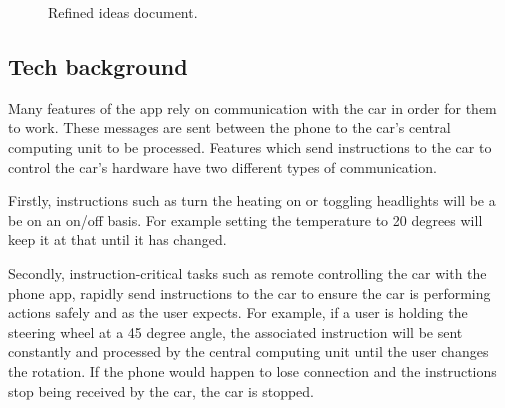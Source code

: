 \documentclass{article}
\begin{document}
\begin{figure}[H]
  \centering
  \caption{Refined ideas document.}\label{refined-ideas}
\end{figure}

\subsection{Tech background}\label{ssec:app-tech} %
Many features of the app rely on communication with the car in order for them to work. These messages are sent between the phone to the car's central computing unit to be processed. Features which send instructions to the car to control the car's hardware have two different types of communication.

Firstly, instructions such as turn the heating on or toggling headlights will be a be on an on/off basis. For example setting the temperature to 20 degrees will keep it at that until it has changed.

Secondly, instruction-critical tasks such as remote controlling the car with the phone app, rapidly send instructions to the car to ensure the car is performing actions safely and as the user expects. For example, if a user is holding the steering wheel at a 45 degree angle, the associated instruction will be sent constantly and processed by the central computing unit until the user changes the rotation. If the phone would happen to lose connection and the instructions stop being received by the car, the car is stopped.
\end{document}
